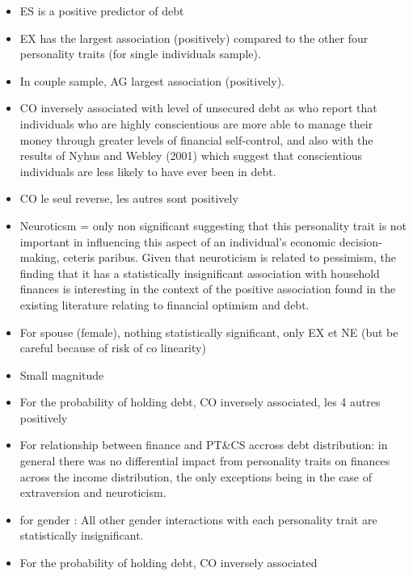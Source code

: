 \documentclass[a4paper, 11pt, onecolumn]{article}
\begin{document}
\cite{Nyhus2001}
\begin{itemize}
\item ES is a positive predictor of debt
\end{itemize}


\cite{Brown2014}
\begin{itemize}
\item EX has the largest association (positively) compared to the other four personality traits (for single individuals sample).
\item In couple sample, AG largest association (positively).
\item CO inversely associated with level of unsecured debt as \cite{Donnelly2012} who report that individuals who are highly conscientious are more able to manage their money through greater levels of financial self-control, and also with the results of Nyhus and Webley (2001) which suggest that conscientious individuals are less likely to have ever been in debt.
\item CO le seul reverse, les autres sont positively
\item Neuroticsm = only non significant suggesting that this personality trait is not important in
influencing this aspect of an individual’s economic decision-making, ceteris paribus.
Given that neuroticism is related to pessimism, the finding that it has a statistically insignificant association with household finances is interesting in the context of the positive association found in the existing literature relating to financial optimism and debt.
\item For spouse (female), nothing statistically significant, only EX et NE (but be careful because of risk of co linearity)
\item Small magnitude
\item For the probability of holding debt, CO inversely associated, les 4 autres positively
\item For relationship between finance and PT\&CS accross debt distribution: in general there was no differential impact from personality traits on finances across the income distribution, the only exceptions being in the case of extraversion and neuroticism.
\item for gender : All other gender interactions with each personality trait are statistically insignificant.
\end{itemize}

\cite{Donnelly2012}
\begin{itemize}
\item For the probability of holding debt, CO inversely associated
\end{itemize}
\end{document}
